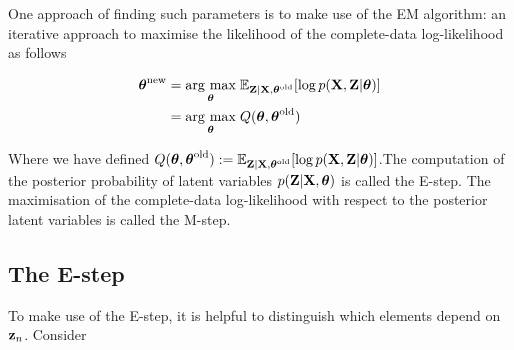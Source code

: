 \documentclass[11pt]{article}
\newcommand{\argmax}[1]{\underset{#1}{\operatorname{arg}\,\operatorname{max}}\;}
\begin{document}
One approach of finding such parameters is to make use of the EM algorithm: an iterative approach to maximise the likelihood of the complete-data log-likelihood as follows

\begin{align}
	\boldsymbol{\theta}^\text{new} &= \argmax{\boldsymbol{\theta}} \mathbb{E}_{{\bf Z}\vert {\bf X}, \boldsymbol{\theta}^\text{old}}[\log p({\bf X}, {\bf Z}\vert \boldsymbol\theta)]\\
	&= \argmax{\boldsymbol{\theta}} Q(\boldsymbol\theta, \boldsymbol\theta^\text{old})
\end{align}

Where we have defined $Q(\boldsymbol\theta, \boldsymbol\theta^\text{old}) := \mathbb{E}_{{\bf Z}\vert {\bf X}, \boldsymbol{\theta}^\text{old}}[\log p({\bf X}, {\bf Z}\vert \boldsymbol\theta)]$.The computation of the posterior probability of latent variables $p({\bf Z}\vert {\bf X}, \boldsymbol\theta)$ is called the E-step. The maximisation of the complete-data log-likelihood with respect to the posterior latent variables is called the M-step.


\subsection{The E-step}
To make use of the E-step, it is helpful to distinguish which elements depend on ${\bf z}_n$. Consider
\end{document}
